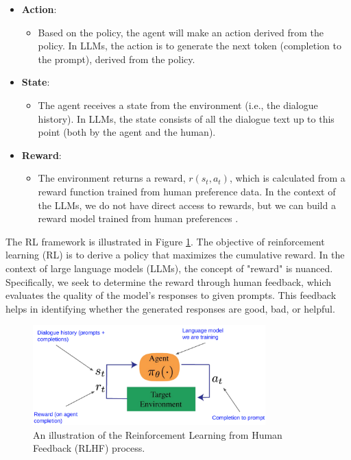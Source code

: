 \begin{itemize}
    \item \textbf{Action}: 
        \begin{itemize}
            \item Based on the policy, the agent will make an action derived from the policy. In LLMs, 
            the action is to generate the next token (completion to the prompt), 
            derived from the policy.
        \end{itemize}
    \item \textbf{State}: 
        \begin{itemize}
            \item The agent receives a state from the environment (i.e., the dialogue history). In 
            LLMs, the state consists of all the dialogue text up to this point 
            (both by the agent and the human).
        \end{itemize}
    \item \textbf{Reward}: 
        \begin{itemize}
            \item The environment returns a reward, \( r(s_t, a_t) \), which is calculated from a 
            reward function trained from human preference data. In the context of the LLMs,
            we do not have direct access to rewards, but we can build a reward model trained from 
            human preferences \cite{christianoDeepReinforcementLearning2017}.
        \end{itemize}
\end{itemize}

The RL framework is illustrated in Figure \ref{fig:rlhf-process}.
The objective of reinforcement learning (RL) is to derive a policy that 
maximizes the cumulative reward. In the context of large language models 
(LLMs), the concept of "reward" is nuanced. Specifically, we seek to determine the 
reward through human feedback, which evaluates the quality of the model's responses to given 
prompts. This feedback helps in identifying whether the generated responses are good, bad, or helpful.


\begin{figure}[h]
    \centering
    \includegraphics[width=0.8\textwidth]{./figures/rlhf_1.png}
    \caption{An illustration of the Reinforcement Learning from Human Feedback (RLHF) process. \cite{lambertBasicsReinforcementLearning}}
    \label{fig:rlhf-process}
\end{figure}